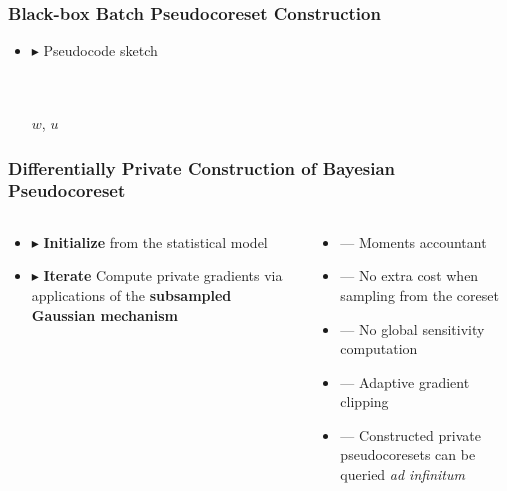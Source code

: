 \documentclass[hyperref={colorlinks = true},unknownkeysallowed]{beamer}
\let\oldcitep=\citep
\renewcommand\citep[1]{\hypersetup{linkcolor=darkred}\hyperlink{#1}{\oldcitep{#1}}}
\begin{document}
\begin{frame}
	\frametitle{Black-box Batch  Pseudocoreset Construction}
	\vspace{-0.5cm}
	\begin{itemize}
		\item $\blacktriangleright$ Pseudocode sketch
		\scriptsize 
		\begin{tcolorbox}
			\begin{algorithmic}[1]
					\\
							\\
						\EndFor
				\EndFor
				\State\Return $w$, $u$%
				\EndProcedure		 
			\end{algorithmic}
		\end{tcolorbox}
		\normalsize
	\end{itemize}
\end{frame}

\begin{frame}
	\frametitle{Differentially Private Construction of Bayesian Pseudocoreset}
	\vspace{-4pt}
	\begin{columns}
		\begin{column}[t]{0.4\textwidth}
		\begin{itemize}
			\item $\blacktriangleright$ \textbf{Initialize}  from the statistical model
			\item $\blacktriangleright$ \textbf{Iterate} Compute private gradients via applications of the \textbf{subsampled Gaussian mechanism}~\citep{abadi16}
		\end{itemize}
		\end{column}
	\pause
		\begin{column}[t]{0.6\textwidth}
		\begin{itemize}
			\item --- {Moments accountant}
			\item --- {No extra  cost when sampling from the coreset}
			\item --- {No global sensitivity computation}
			\item --- {Adaptive gradient clipping} 
			\item --- {Constructed private pseudocoresets can be queried \emph{ad infinitum}} 
		\end{itemize}
		\end{column}
	\end{columns}
\end{frame}
\end{document}
